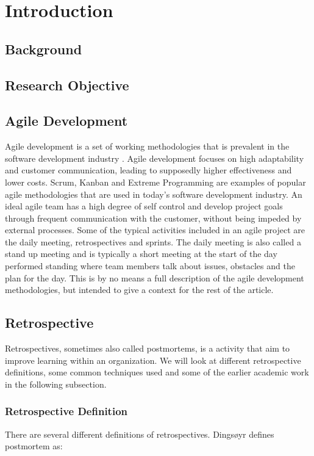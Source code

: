 \chapter{Introduction}
\section{Background}
\section{Research Objective}


\section{Agile Development}
Agile development is a set of working methodologies that is prevalent in the software development industry \cite{Tessem2014}. Agile development focuses on high adaptability and customer communication, leading to supposedly higher effectiveness and lower costs. Scrum, Kanban and Extreme Programming are examples of popular agile methodologies that are used in today's software development industry. An ideal agile team has a high degree of self control and develop project goals through frequent communication with the customer, without being impeded by external processes. Some of the typical activities included in an agile project are the daily meeting, retrospectives and sprints. The daily meeting is also called a stand up meeting and is typically a short meeting at the start of the day performed standing where team members talk about issues, obstacles and the plan for the day\cite{Moe2012}. This is by no means a full description of the agile development methodologies, but intended to give a context for the rest of the article.

\section{Retrospective}
Retrospectives, sometimes also called postmortems, is a activity that aim to improve learning within an organization. We will look at different retrospective definitions, some common techniques used and some of the earlier academic work in the following subsection. 

\subsection{Retrospective Definition}
There are several different definitions of retrospectives. Dingsøyr \cite{Dingsoyr2004} defines postmortem as: 

